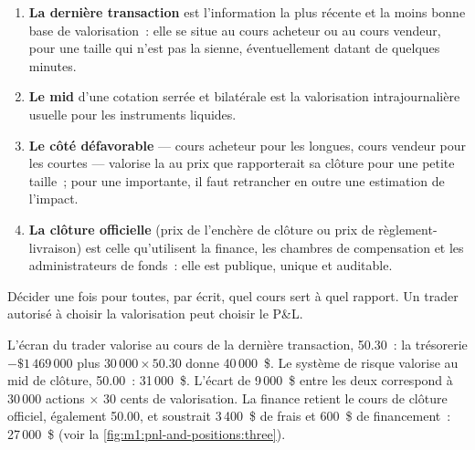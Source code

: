 \begin{method}\label{met:m1:pnl-and-positions:mark}
\begin{enumerate}
\item \textbf{La dernière transaction} est l'information la plus récente et la moins bonne
  base de valorisation~: elle se situe au cours acheteur ou au cours vendeur, pour une taille qui n'est pas la sienne, éventuellement
  datant de quelques minutes.
\item \textbf{Le mid} d'une cotation serrée et bilatérale est la valorisation intrajournalière usuelle
  pour les instruments liquides.
\item \textbf{Le côté défavorable} --- cours acheteur pour les  longues, cours vendeur pour les  courtes ---
  valorise la  au prix que rapporterait sa clôture pour une petite taille~; pour une
   importante, il faut retrancher en outre une estimation de l'impact.
\item \textbf{La clôture officielle} (prix de l'enchère de clôture ou prix de règlement-livraison)
  est celle qu'utilisent la finance, les chambres de compensation et les administrateurs de fonds~: elle est
  publique, unique et auditable.
\end{enumerate}
Décider une fois pour toutes, par écrit, quel cours sert à quel rapport. Un trader autorisé à
choisir la valorisation peut choisir le P\&L.
\end{method}

\begin{example}\label{ex:m1:pnl-and-positions:three}
L'écran du trader valorise au cours de la dernière transaction, 50.30~: la trésorerie $-\$1\,469\,000$
plus $30\,000 \times 50.30$ donne 40\,000~\$. Le système de risque valorise au
mid de clôture, 50.00~: 31\,000~\$. L'écart de 9\,000~\$ entre les deux correspond à $30\,000$ actions
$\times$ 30 cents de valorisation. La finance retient le cours de clôture officiel, également 50.00, et
soustrait 3\,400~\$ de frais et 600~\$ de financement~: 27\,000~\$
(voir la \cref{fig:m1:pnl-and-positions:three}).
\end{example}

